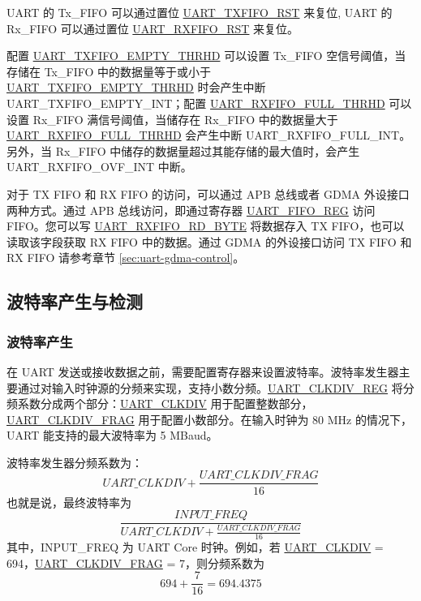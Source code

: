 \documentclass[main\_\_CN.tex]{subfiles}
\begin{document}
UART 的 Tx\_FIFO 可以通过置位 \hyperref[fielddesc:UARTTXFIFORST]{UART\_TXFIFO\_RST} 来复位, UART 的 Rx\_FIFO 可以通过置位 \hyperref[fielddesc:UARTRXFIFORST]{UART\_RXFIFO\_RST} 来复位。



配置 \hyperref[fielddesc:UARTTXFIFOEMPTYTHRHD]{UART\_TXFIFO\_EMPTY\_THRHD} 可以设置 Tx\_FIFO 空信号阈值，当存储在 Tx\_FIFO 中的数据量等于或小于 \\\hyperref[fielddesc:UARTTXFIFOEMPTYTHRHD]{UART\_TXFIFO\_EMPTY\_THRHD} 时会产生中断 UART\_TXFIFO\_EMPTY\_INT；配置 \hyperref[fielddesc:UARTRXFIFOFULLTHRHD]{UART\_RXFIFO\_FULL\_THRHD} 可以设置 Rx\_FIFO 满信号阈值，当储存在 Rx\_FIFO 中的数据量大于 \hyperref[fielddesc:UARTRXFIFOFULLTHRHD]{UART\_RXFIFO\_FULL\_THRHD} 会产生中断 UART\_RXFIFO\_FULL\_INT。另外，当 Rx\_FIFO 中储存的数据量超过其能存储的最大值时，会产生 UART\_RXFIFO\_OVF\_INT 中断。

对于 TX FIFO 和 RX FIFO 的访问，可以通过 APB 总线或者 GDMA 外设接口两种方式。通过 APB 总线访问，即通过寄存器 \hyperref[regdesc:UARTFIFOREG]{UART\_FIFO\_REG} 访问 FIFO。您可以写 \hyperref[fielddesc:UARTRXFIFORDBYTE]{UART\_RXFIFO\_RD\_BYTE} 将数据存入 TX FIFO，也可以读取该字段获取 RX FIFO 中的数据。通过 GDMA 的外设接口访问 TX FIFO 和 RX FIFO 请参考章节 \ref{sec:uart-gdma-control}。

\subsection{波特率产生与检测}

\subsubsection{波特率产生}

在 UART 发送或接收数据之前，需要配置寄存器来设置波特率。波特率发生器主要通过对输入时钟源的分频来实现，支持小数分频。\hyperref[regdesc:UARTCLKDIVREG]{UART\_CLKDIV\_REG} 将分频系数分成两个部分：\hyperref[fielddesc:UARTCLKDIV]{UART\_CLKDIV} 用于配置整数部分，\hyperref[fielddesc:UARTCLKDIVFRAG]{UART\_CLKDIV\_FRAG} 用于配置小数部分。在输入时钟为 80 MHz 的情况下，UART 能支持的最大波特率为 5 MBaud。

波特率发生器分频系数为：
\[
    \hyperref[fielddesc:UARTCLKDIV]{UART\_CLKDIV} + \frac{\hyperref[fielddesc:UARTCLKDIVFRAG]{UART\_CLKDIV\_FRAG}}{16}
\]
也就是说，最终波特率为
\[
    \frac{INPUT\_FREQ}{\hyperref[fielddesc:UARTCLKDIV]{UART\_CLKDIV} + \frac{\hyperref[fielddesc:UARTCLKDIVFRAG]{UART\_CLKDIV\_FRAG}}{16}}
\]
其中，INPUT\_FREQ 为 UART Core 时钟。例如，若 \hyperref[fielddesc:UARTCLKDIV]{UART\_CLKDIV} = 694，\hyperref[fielddesc:UARTCLKDIVFRAG]{UART\_CLKDIV\_FRAG} = 7，则分频系数为
\[
    694 + \frac{7}{16} = 694.4375
\]
\end{document}
